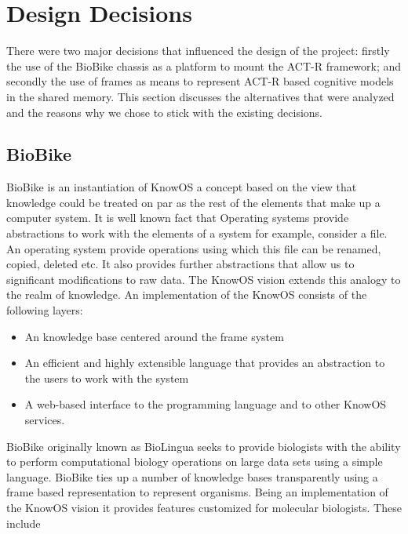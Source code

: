 \section{Design Decisions}
There were two major decisions that influenced the design of the
project: firstly the use of the BioBike chassis as a platform to
mount the ACT-R framework; and secondly the use of frames as means to
represent ACT-R based cognitive models in the shared memory. This
section discusses the alternatives that were analyzed and the reasons
why we chose to stick with the existing decisions.

\subsection{BioBike}

BioBike is an instantiation of
KnowOS\cite{oai:CiteSeerXPSU:10.1.1.75.7132} a concept based on the
view that knowledge could be treated on par as the rest of the
elements that make up a computer system. It is well known fact that
Operating systems provide abstractions to work with the elements of a
system for example, consider a file. An operating system provide
operations using which this file can be renamed, copied, deleted
etc. It also provides further abstractions that allow us to significant
modifications to raw data. The KnowOS vision extends this analogy to
the realm of knowledge. An implementation of the KnowOS consists of
the following layers\cite{oai:CiteSeerXPSU:10.1.1.75.7132}:


\begin{itemize}
\item An knowledge base centered around the frame system
\item An efficient and highly extensible language that provides an
  abstraction to the users to work with the system
\item A web-based interface to the programming language and to other
  KnowOS services.
\end{itemize}

BioBike originally known as BioLingua seeks to provide biologists with
the ability to perform computational biology operations on large data
sets using a simple language. BioBike ties up a number of knowledge
bases transparently using a frame based representation to represent
organisms. Being an implementation of the KnowOS vision it provides
features customized for molecular biologists. These include\cite{journals/bioinformatics/MassarTES05}

